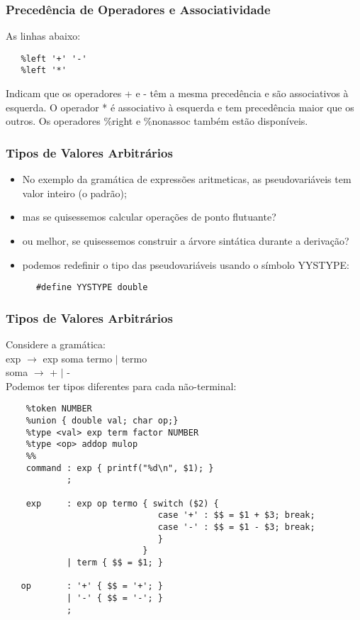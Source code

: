 \documentclass[table]{beamer}
\begin{document}
\begin{frame}[fragile]
   \frametitle{Precedência de Operadores e Associatividade}
   As linhas abaixo:
   \begin{verbatim}
   %left '+' '-'
   %left '*'
   \end{verbatim}
   Indicam que os operadores + e - têm a mesma precedência e são associativos à esquerda. O operador * é associativo à esquerda e tem precedência maior que os outros. Os operadores \%right e \%nonassoc também estão disponíveis.
\end{frame}

\begin{frame}[fragile]
   \frametitle{Tipos de Valores Arbitrários}
   \begin{itemize}
      \item No exemplo da gramática de expressões aritmeticas, as pseudovariáveis tem valor inteiro (o padrão);
      \item mas se quisessemos calcular operações de ponto flutuante?
      \item ou melhor, se quisessemos construir a árvore sintática durante a derivação?
      \item podemos redefinir o tipo das pseudovariáveis usando o símbolo YYSTYPE:
   \end{itemize}
   \begin{verbatim}
      #define YYSTYPE double
   \end{verbatim}
\end{frame}

\begin{frame}[fragile]
   \frametitle{Tipos de Valores Arbitrários}
   Considere a gramática: \\
   exp $\rightarrow$ exp soma termo $|$ termo \\
   soma $\rightarrow$ + $|$ - \\
   Podemos ter tipos diferentes para cada não-terminal:
   \scriptsize
    \begin{verbatim}
    %token NUMBER
    %union { double val; char op;}
    %type <val> exp term factor NUMBER
    %type <op> addop mulop
    %%
    command : exp { printf("%d\n", $1); }
            ;

    exp     : exp op termo { switch ($2) {
                              case '+' : $$ = $1 + $3; break;
                              case '-' : $$ = $1 - $3; break;
                              }
                           }
            | term { $$ = $1; }

   op       : '+' { $$ = '+'; }
            | '-' { $$ = '-'; }
            ;
    \end{verbatim}
\end{frame}
\end{document}
